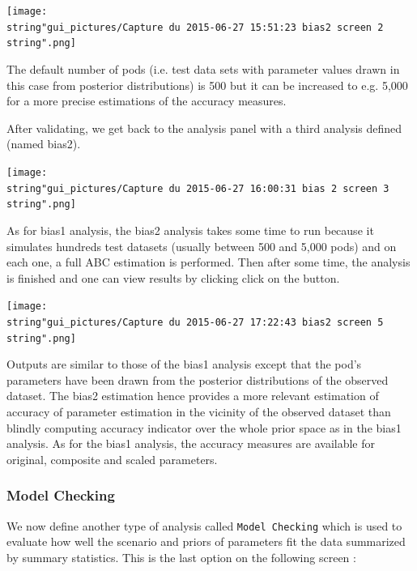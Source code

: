 \texttt{[image: \\string"gui\_pictures/Capture du 2015-06-27 15:51:23 bias2 screen 2\\string".png]}

The default number of pods (i.e. test data sets with parameter values
drawn in this case from posterior distributions) is 500 but it can
be increased to e.g. 5,000 for a more precise estimations of the accuracy
measures.

After validating, we get back to the analysis panel with a third analysis
defined (named bias2).

\texttt{[image: \\string"gui\_pictures/Capture du 2015-06-27 16:00:31 bias 2 screen 3\\string".png]}

As for bias1 analysis, the bias2 analysis takes some time to run because
it simulates hundreds test datasets (usually between 500 and 5,000
pods) and on each one, a full ABC estimation is performed. Then after
some time, the analysis is finished and one can view results by clicking
click on the  button.

\texttt{[image: \\string"gui\_pictures/Capture du 2015-06-27 17:22:43 bias2 screen 5\\string".png]}

Outputs are similar to those of the bias1 analysis except that the
pod's parameters have been drawn from the posterior distributions
of the observed dataset. The bias2 estimation hence provides a more
relevant estimation of accuracy of parameter estimation in the vicinity
of the observed dataset than blindly computing accuracy indicator
over the whole prior space as in the bias1 analysis. As for the bias1
analysis, the accuracy measures are available for original, composite
and scaled parameters.


\subsubsection{Model Checking}

We now define another type of analysis called \texttt{Model Checking}
which is used to evaluate how well the scenario and priors of parameters
fit the data summarized by summary statistics. This is the last option
on the following screen :\\


